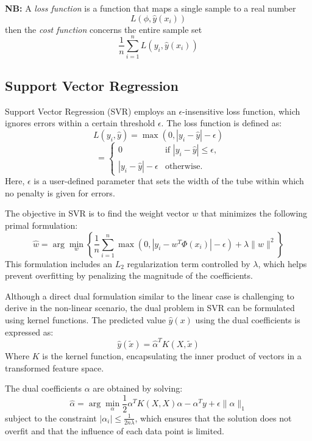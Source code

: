 \textbf{NB:} A \textit{loss function} is a function that maps a single sample to a real number
\[ L(\phi, \hat{y}(x_i)) \]
then the \textit{cost function} concerns the entire sample set
\[ \frac{1}{n} \sum_{i=1}^n L(y_i, \hat{y}(x_i)) \]

\subsection*{Support Vector Regression}

Support Vector Regression (SVR) employs an $\epsilon$-insensitive loss function, which ignores errors within a certain threshold $\epsilon$. The loss function is defined as:
\[ 
L(y_i, \hat{y}) = \max(0, |y_i - \hat{y}| - \epsilon) 
\]
\[ 
= \begin{cases} 
0 & \text{if } |y_i - \hat{y}| \leq \epsilon, \\
|y_i - \hat{y}| - \epsilon & \text{otherwise.}
\end{cases} 
\]
Here, $\epsilon$ is a user-defined parameter that sets the width of the tube within which no penalty is given for errors.

The objective in SVR is to find the weight vector $w$ that minimizes the following primal formulation:
\[ 
\hat{w} = \arg\min_w \left\{ \frac{1}{n} \sum_{i=1}^n \max(0, |y_i - w^T \Phi(x_i)| - \epsilon) + \lambda \|w\|^2 \right\} 
\]
This formulation includes an $L_2$ regularization term controlled by $\lambda$, which helps prevent overfitting by penalizing the magnitude of the coefficients.

Although a direct dual formulation similar to the linear case is challenging to derive in the non-linear scenario, the dual problem in SVR can be formulated using kernel functions. The predicted value $\hat{y}(x)$ using the dual coefficients is expressed as:
\[ 
\hat{y}(\tilde{x}) = \hat{\alpha}^T K(X, \tilde{x}) 
\]
Where $K$ is the kernel function, encapsulating the inner product of vectors in a transformed feature space.

The dual coefficients $\alpha$ are obtained by solving:
\[ 
\hat{\alpha} = \arg\min_{\alpha} \frac{1}{2} \alpha^T K(X, X) \alpha - \alpha^T y + \epsilon \| \alpha \|_1 
\]
subject to the constraint $|\alpha_i| \leq \frac{1}{2n\lambda}$, which ensures that the solution does not overfit and that the influence of each data point is limited.



